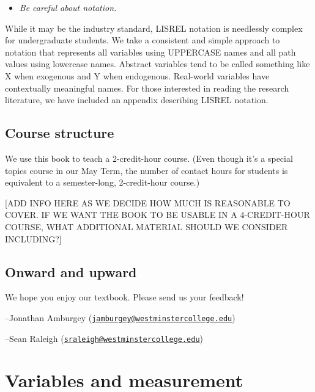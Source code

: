 \documentclass[
]{book}
\providecommand{\tightlist}{%
  \setlength{\itemsep}{0pt}\setlength{\parskip}{0pt}}
\begin{document}
\begin{itemize}
\tightlist
\item
  \emph{Be careful about notation.}
\end{itemize}

While it may be the industry standard, LISREL notation is needlessly complex for undergraduate students. We take a consistent and simple approach to notation that represents all variables using UPPERCASE names and all path values using lowercase names. Abstract variables tend to be called something like X when exogenous and Y when endogenous. Real-world variables have contextually meaningful names. For those interested in reading the research literature, we have included an appendix describing LISREL notation.

\hypertarget{intro-structure}{%
\section*{Course structure}\label{intro-structure}}

We use this book to teach a 2-credit-hour course. (Even though it's a special topics course in our May Term, the number of contact hours for students is equivalent to a semester-long, 2-credit-hour course.)

{[}ADD INFO HERE AS WE DECIDE HOW MUCH IS REASONABLE TO COVER. IF WE WANT THE BOOK TO BE USABLE IN A 4-CREDIT-HOUR COURSE, WHAT ADDITIONAL MATERIAL SHOULD WE CONSIDER INCLUDING?{]}

\hypertarget{intro-onward}{%
\section*{Onward and upward}\label{intro-onward}}

We hope you enjoy our textbook. Please send us your feedback!

--Jonathan Amburgey (\href{mailto:jamburgey@westminstercollege.edu}{\nolinkurl{jamburgey@westminstercollege.edu}})

--Sean Raleigh (\href{mailto:sraleigh@westminstercollege.edu}{\nolinkurl{sraleigh@westminstercollege.edu}})

\hypertarget{variables}{%
\chapter{Variables and measurement}\label{variables}}
\end{document}

